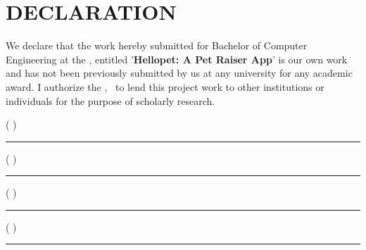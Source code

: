 \section*{DECLARATION}

We declare that the work hereby submitted for Bachelor of Computer Engineering at the \theinstitute, \thecampus entitled '\textbf{Hellopet: A Pet Raiser App}' is our own work and has not been previously submitted by
us at any university for any academic award.
I authorize the \theinstitute, \thecampus \ to lend this project work
to other institutions or individuals for the purpose of scholarly research.

\vspace{1cm}
\theauthora ( \rollnoA ) \hspace{2cm}\rule{0.4\textwidth}{0.4pt}
\vspace{0.3cm}

\theauthorb ( \rollnoB )\hspace{1.5cm}\rule{0.4\textwidth}{0.4pt}
\vspace{0.3cm}

\theauthorc ( \rollnoC )\hspace{1.75cm}\rule{0.4\textwidth}{0.4pt}
\vspace{0.3cm}

\theauthord ( \rollnoD )\hspace{2cm}\rule{0.4\textwidth}{0.4pt}\\
\\
\vspace{0.7cm}
\noindent \thedate \\
